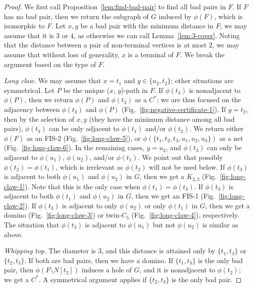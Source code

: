 \documentclass[10pt]{article}
\newcommand{\stpath}[2]{($#1$, $#2$)-path}
\newcommand{\og}[1]{\ensuremath{\phi(#1)}}
\begin{document}
\begin{proof}
  We first call Proposition~\ref{lem:find-bad-pair} to find all bad
  pairs in $F$.  If $F$ has no bad pair, then we return the subgraph
  of $G$ induced by \og{F}, which is isomorphic to $F$.  Let $x,y$ be
  a bad pair with the minimum distance in $F$; we may assume that it
  is $3$ or $4$, as otherwise we can call Lemma~\ref{lem:3-cover}.
  Noting that the distance between a pair of non-terminal vertices is
  at most $2$, we may assume that without loss of generality, $x$ is a
  terminal of $F$.  We break the argument based on the type of $F$.

  {\em Long claw.}  We may assume that $x = t_1$ and $y\in
  \{u_2,t_2\}$; other situations are symmetrical.  Let $P$ be the
  unique \stpath{x}{y} in $F$.  If \og{t_3} is nonadjacent to \og{P},
  then we return \og{P} and \og{t_3} as a $C^*$; we are thus focused
  on the adjacency between \og{t_3} and \og{P}
  (Fig.~\ref{fig:negative-certificate-1}).  If $y = t_2$, then by the
  selection of $x,y$ (they have the minimum distance among all bad
  pairs), $\og{t_3}$ can be only adjacent to $\og{t_1}$ and/or
  $\og{t_2}$.  We return either $\og{F}$ as an FIS-2
  (Fig.~\ref{fig:long-claw-5}), or $\og{\{t_1,t_2,t_3,u_1,u_2,u_3\}}$
  as a net (Fig.~\ref{fig:long-claw-6}).  In the remaining cases, $y =
  u_2$, and $\og{t_3}$ can only be adjacent to \og{u_1}, \og{u_2},
  and/or \og{t_1}.  We point out that possibly $\og{t_2} = \og{t_1}$,
  which is irrelevant as $\og{t_2}$ will not be used below.  If
  $\og{t_3}$ is adjacent to both $\og{u_1}$ and $\og{u_2}$ in $G$,
  then we get a $K_{2,3}$ (Fig.~\ref{fig:long-claw-1}).  Note that
  this is the only case when $\og{t_1} = \og{t_3}$.  If $\og{t_3}$ is
  adjacent to both $\og{t_1}$ and $\og{u_2}$ in $G$, then we get an
  FIS-1 (Fig.~\ref{fig:long-claw-2}).  If $\og{t_3}$ is adjacent to
  only $\og{u_2}$ or only $\og{t_1}$ in $G$, then we get a domino
  (Fig.~\ref{fig:long-claw-3}) or twin-$C_5$
  (Fig.~\ref{fig:long-claw-4}), respectively.  The situation that
  $\og{t_3}$ is adjacent to \og{u_1} but not \og{u_2} is similar as
  above.

  {\em Whipping top.} The diameter is $3$, and this distance is
  attained only by $\{t_1,t_3\}$ or $\{t_2, t_3\}$.  If both are bad
  pairs, then we have a domino.  If $\{t_1,t_3\}$ is the only bad
  pair, then $\og{F\setminus N[t_2]}$ induces a hole of $G$, and it is
  nonadjacent to \og{t_2}; we get a $C^*$.  A symmetrical argument
  applies if $\{t_2,t_3\}$ is the only bad pair.


\end{proof}
\end{document}
